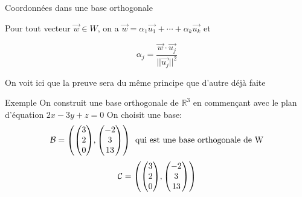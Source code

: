 \begin{parag}{Coordonnées dans une base orthogonale}
    \begin{theoreme}
        Pour tout vecteur $\vec{w} \in W$, on a $\vec{w} = \alpha_1\vec{u_1} + \cdots + \alpha_k\vec{u_k}$ et 
        \begin{formule}
            \[\alpha_j = \frac{\vec{w}\cdot\vec{u_j}}{||\vec{u_j}||^2}\]
        \end{formule}
    \end{theoreme}
    On voit ici que la preuve sera du même principe que d'autre déjà faite 
    \begin{subparag}{Exemple}
    On construit une base orthogonale de $\mathbb{R}^3$ en commençant avec le plan d'équation $2x - 3y + z = 0$
    On choisit une base:
    \[\bmath = \left(\begin{pmatrix}
        3 \\ 2 \\ 0
    \end{pmatrix}, \begin{pmatrix}
        -2 \\ 3 \\ 13
    \end{pmatrix}\right) \; \text{ qui est une base orthogonale de W}\]
    \[\cmath = \left(\begin{pmatrix}
        3 \\ 2 \\ 0
    \end{pmatrix}, \begin{pmatrix}
        -2 \\ 3 \\ 13
    \end{pmatrix}\right)\]
    \end{subparag}
\end{parag}